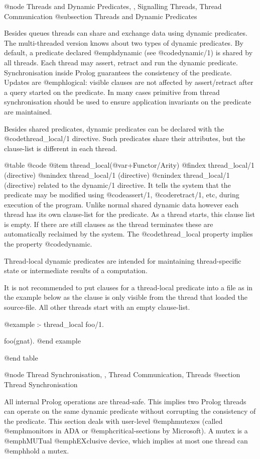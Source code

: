 @node Threads and Dynamic Predicates, , Signalling Threads, Thread Communication
@subsection Threads and Dynamic Predicates

Besides queues threads can share and exchange data using dynamic
predicates. The multi-threaded version knows about two types of
dynamic predicates. By default, a predicate declared @emph{dynamic}
(see @code{dynamic/1}) is shared by all threads. Each thread may
assert, retract and run the dynamic predicate. Synchronisation inside
Prolog guarantees the consistency of the predicate. Updates are
@emph{logical}: visible clauses are not affected by assert/retract
after a query started on the predicate. In many cases primitive from
thread synchronisation should be used to ensure application invariants on
the predicate are maintained.

Besides shared predicates, dynamic predicates can be declared with the
@code{thread_local/1} directive. Such predicates share their
attributes, but the clause-list is different in each thread.

@table @code
@item thread_local(@var{+Functor/Arity}) 
@findex thread_local/1 (directive)
@snindex thread_local/1 (directive)
@cnindex thread_local/1 (directive)
related to the dynamic/1 directive.  It tells the system that the
predicate may be modified using @code{assert/1}, @code{retract/1},
etc, during execution of the program.  Unlike normal shared dynamic
data however each thread has its own clause-list for the predicate.
As a thread starts, this clause list is empty.  If there are still
clauses as the thread terminates these are automatically reclaimed by
the system.  The @code{thread_local} property implies
the property @code{dynamic}.

Thread-local dynamic predicates are intended for maintaining
thread-specific state or intermediate results of a computation.

It is not recommended to put clauses for a thread-local predicate into
a file as in the example below as the clause is only visible from the
thread that loaded the source-file.  All other threads start with an
empty clause-list.

@example
:- thread_local
    foo/1.

foo(gnat).
@end example

@end table


@node Thread Synchronisation, , Thread Communication, Threads
@section Thread Synchronisation

All internal Prolog operations are thread-safe. This implies two Prolog
threads can operate on the same dynamic predicate without corrupting the
consistency of the predicate. This section deals with user-level
@emph{mutexes} (called @emph{monitors} in ADA or
@emph{critical-sections} by Microsoft).  A mutex is a
@emph{MUT}ual @emph{EX}clusive device, which implies at most one thread
can @emph{hold} a mutex.

